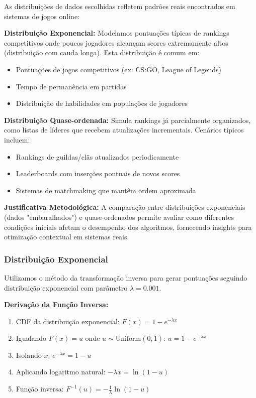 \documentclass[conference]{IEEEtran}
\begin{document}
As distribuições de dados escolhidas refletem padrões reais encontrados em sistemas de jogos online:

\textbf{Distribuição Exponencial:} Modelamos pontuações típicas de rankings competitivos onde poucos jogadores alcançam scores extremamente altos (distribuição com cauda longa). Esta distribuição é comum em:
\begin{itemize}
\item Pontuações de jogos competitivos (ex: CS:GO, League of Legends)
\item Tempo de permanência em partidas
\item Distribuição de habilidades em populações de jogadores
\end{itemize}

\textbf{Distribuição Quase-ordenada:} Simula rankings já parcialmente organizados, como listas de líderes que recebem atualizações incrementais. Cenários típicos incluem:
\begin{itemize}
\item Rankings de guildas/clãs atualizados periodicamente
\item Leaderboards com inserções pontuais de novos scores
\item Sistemas de matchmaking que mantêm ordem aproximada
\end{itemize}

\textbf{Justificativa Metodológica:} A comparação entre distribuições exponenciais (dados "embaralhados") e quase-ordenados permite avaliar como diferentes condições iniciais afetam o desempenho dos algoritmos, fornecendo insights para otimização contextual em sistemas reais.

\subsubsection{Distribuição Exponencial}
Utilizamos o método da transformação inversa para gerar pontuações seguindo distribuição exponencial com parâmetro $\lambda = 0.001$.

\textbf{Derivação da Função Inversa:}
\begin{enumerate}
\item CDF da distribuição exponencial: $F(x) = 1 - e^{-\lambda x}$
\item Igualando $F(x) = u$ onde $u \sim \text{Uniform}(0,1)$: $u = 1 - e^{-\lambda x}$
\item Isolando $x$: $e^{-\lambda x} = 1 - u$
\item Aplicando logaritmo natural: $-\lambda x = \ln(1 - u)$
\item Função inversa: $F^{-1}(u) = -\frac{1}{\lambda} \ln(1-u)$
\end{enumerate}
\end{document}
